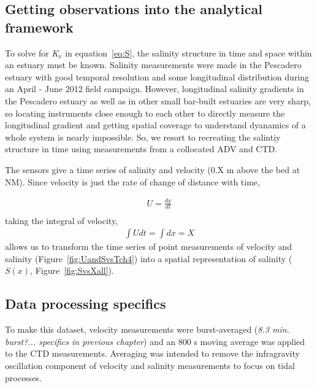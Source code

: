 \subsection{Getting observations into the analytical framework} \label{ssec:ObsInto1DAdvDiff}
To solve for \emph{K$_x$} in equation~\ref{eq:S}, the salinity structure in time and space within an estuary must be known. Salinity measurements were made in the Pescadero estuary with good temporal resolution and some longitudinal distribution during an April - June 2012 field campaign. However, longitudinal salinity gradients in the Pescadero estuary as well as in other small bar-built estuaries are very sharp, so locating instruments close enough to each other to directly measure the longitudinal gradient and getting spatial coverage to understand dyanamics of a whole system is nearly impossible. So, we resort to recreating the salintiy structure in time using measurements from a collocated ADV and CTD. 

The sensors give a time series of salinity and velocity (0.X m above the bed at NM). Since velocity is just the rate of change of distance with time,

\begin{eqnarray}
U = \frac{dx}{dt} \label{eq:uEdxdt}\\
\end{eqnarray}
taking the integral of velocity,
\begin{eqnarray}
\int{Udt} = \int{dx} = X \label{eq:intuEx}
\end{eqnarray}
allows us to transform the time series of point measurements of velocity and salinity (Figure~\ref{fig:UandSvsTch4}) into a spatial representation of salinity ($S(x)$, Figure~\ref{fig:SvsXall}).

\subsection{Data processing specifics} \label{ssec:DataProcessing}
To make this dataset, velocity measurements were burst-averaged (\emph{8.3 min. burst?... specifics in previous chapter}) and an 800 s moving average was applied to the CTD measurements.  Averaging was intended to remove the infragravity oscillation component of velocity and salinity measurements to focus on tidal processes. 

